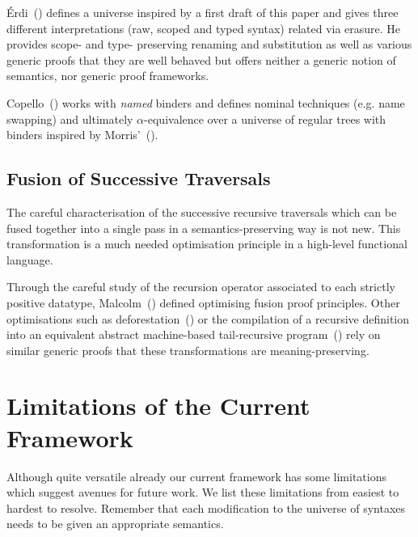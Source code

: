 Érdi~(\citeyear{gergodraft}) defines a universe inspired by a first draft of
this paper and gives three different interpretations (raw, scoped and
typed syntax) related via erasure.
%
He provides scope- and type- preserving renaming and
substitution as well as various generic proofs that they are well behaved but
offers neither a generic notion of semantics, nor generic proof frameworks.

Copello~(\citeyear{copello2017}) works with \emph{named} binders and
defines nominal techniques (e.g. name swapping) and ultimately
$\alpha$-equivalence over a universe of regular trees with binders
inspired by Morris'~(\citeyear{morris-regulartt}).

\subsection{Fusion of Successive Traversals}

The careful characterisation of the successive recursive traversals which can be
fused together into a single pass in a semantics-preserving way is not new. This
transformation is a much needed optimisation principle in a high-level
functional language.

Through the careful study of the recursion operator associated to each
strictly positive datatype,
Malcolm~(\citeyear{DBLP:journals/scp/Malcolm90}) defined optimising
fusion proof principles.
%
Other optimisations such as deforestation~(\cite{DBLP:journals/tcs/Wadler90})
or the compilation of a recursive definition into an equivalent abstract
machine-based tail-recursive program~(\cite{DBLP:conf/icfp/CortinasS18})
rely on similar generic proofs that these transformations are
meaning-preserving.


\section{Limitations of the Current Framework}


Although quite versatile already our current framework has some limitations
which suggest avenues for future work. We list these limitations from easiest
to hardest to resolve. Remember that each modification to the universe of
syntaxes needs to be given an appropriate semantics.

